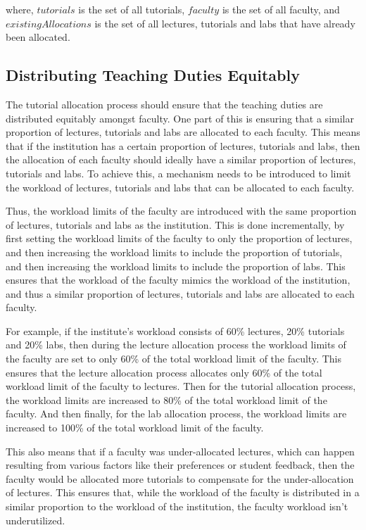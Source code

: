where, $tutorials$ is the set of all tutorials, $faculty$ is the set of all faculty, and $existingAllocations$ is the set of all lectures, tutorials and labs that have already been allocated.

\subsection{Distributing Teaching Duties Equitably}

The tutorial allocation process should ensure that the teaching duties are distributed equitably amongst faculty. One part of this is ensuring that a similar proportion of lectures, tutorials and labs are allocated to each faculty. This means that if the institution has a certain proportion of lectures, tutorials and labs, then the allocation of each faculty should ideally have a similar proportion of lectures, tutorials and labs. To achieve this, a mechanism needs to be introduced to limit the workload of lectures, tutorials and labs that can be allocated to each faculty.

Thus, the workload limits of the faculty are introduced with the same proportion of lectures, tutorials and labs as the institution. This is done incrementally, by first setting the workload limits of the faculty to only the proportion of lectures, and then increasing the workload limits to include the proportion of tutorials, and then increasing the workload limits to include the proportion of labs. This ensures that the workload of the faculty mimics the workload of the institution, and thus a similar proportion of lectures, tutorials and labs are allocated to each faculty.

For example, if the institute's workload consists of 60\% lectures, 20\% tutorials and 20\% labs, then during the lecture allocation process the workload limits of the faculty are set to only 60\% of the total workload limit of the faculty. This ensures that the lecture allocation process allocates only 60\% of the total workload limit of the faculty to lectures. Then for the tutorial allocation process, the workload limits are increased to 80\% of the total workload limit of the faculty. And then finally, for the lab allocation process, the workload limits are increased to 100\% of the total workload limit of the faculty.

This also means that if a faculty was under-allocated lectures, which can happen resulting from various factors like their preferences or student feedback, then the faculty would be allocated more tutorials to compensate for the under-allocation of lectures. This ensures that, while the workload of the faculty is distributed in a similar proportion to the workload of the institution, the faculty workload isn't underutilized.

